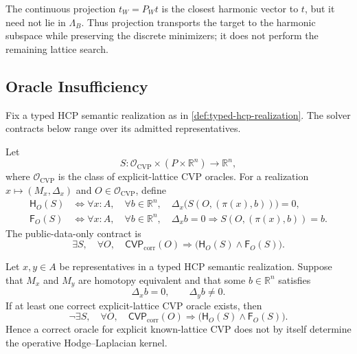 The continuous projection \(t_W=P_Wt\) is the closest harmonic vector to
\(t\), but it need not lie in \(\Lambda_B\). Thus projection transports the
target to the harmonic subspace while preserving the discrete minimizers; it
does not perform the remaining lattice search.

\subsection{Oracle Insufficiency}

Fix a typed HCP semantic realization as in \cref{def:typed-hcp-realization}.
The solver contracts below range over its admitted representatives.

\begin{definition}\label{def:public-hodge-solver-contract}
  Let
  \[
    S:\mathcal O_{\mathrm{CVP}}\times
      (P\times\mathbb R^n)\longrightarrow\mathbb R^n,
  \]
  where \(\mathcal O_{\mathrm{CVP}}\) is the class of explicit-lattice CVP
  oracles. For a realization \(x\mapsto(M_x,\Delta_x)\) and
  \(O\in\mathcal O_{\mathrm{CVP}}\), define
  \[
  \begin{aligned}
    \mathsf H_O(S)
    &\Longleftrightarrow
    \forall x:A,\quad
    \forall b\in\mathbb R^n,\quad
    \Delta_x\bigl(S(O,(\pi(x),b))\bigr)=0,\\
    \mathsf F_O(S)
    &\Longleftrightarrow
    \forall x:A,\quad
    \forall b\in\mathbb R^n,\quad
    \Delta_xb=0\Rightarrow S(O,(\pi(x),b))=b.
  \end{aligned}
  \]
  The public-data-only contract is
  \[
    \exists S,\quad
    \forall O,\quad
    \mathsf{CVP}_{\mathrm{corr}}(O)\Rightarrow
    \bigl(
      \mathsf H_O(S)
      \wedge
      \mathsf F_O(S)
    \bigr).
  \]
\end{definition}

\begin{proposition}\label{prop:cvp-insufficient}
  Let \(x,y\in A\) be representatives in a typed HCP semantic realization.
  Suppose that \(M_x\) and \(M_y\) are homotopy equivalent and that some
  \(b\in\mathbb R^n\) satisfies
  \[
    \Delta_xb=0,
    \qquad
    \Delta_yb\ne0.
  \]
  If at least one correct explicit-lattice CVP oracle exists, then
  \[
    \neg\exists S,\quad
    \forall O,\quad
    \mathsf{CVP}_{\mathrm{corr}}(O)\Rightarrow
    \bigl(
      \mathsf H_O(S)
      \wedge
      \mathsf F_O(S)
    \bigr).
  \]
  Hence a correct oracle for explicit known-lattice CVP does not by itself
  determine the operative Hodge--Laplacian kernel.
\end{proposition}

